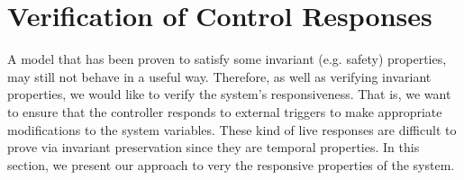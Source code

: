 \section{Verification of Control Responses}
\label{sec:verificationResponses}

A model that has been proven to satisfy some invariant (e.g. safety) properties, may still not behave in a useful way.
Therefore, as well as verifying invariant properties, we would like to verify the system's responsiveness.  
That is, we want to ensure that the controller responds to external triggers to make appropriate modifications to the system variables. 
These kind of live responses are difficult to prove via invariant
preservation since they are temporal properties.  In this section, we
present our approach to very the responsive properties of the system.


